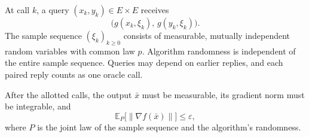 \documentclass[10pt]{article}
\theoremstyle{definition}
\begin{document}
At call $k$, a query $(x_k,y_k)\in E\times E$ receives
\[
\bigl(g(x_k,\xi_k),\,g(y_k,\xi_k)\bigr).
\]
The sample sequence $(\xi_k)_{k\geq0}$ consists of measurable, mutually independent random variables with common law $p$. Algorithm randomness is independent of the entire sample sequence. Queries may depend on earlier replies, and each paired reply counts as one oracle call.

After the allotted calls, the output $\bar{x}$ must be measurable, its gradient norm must be integrable, and
\[
\mathbb{E}_{P}\bigl[\|\nabla f(\bar{x})\|\bigr]\leq\varepsilon,
\]
where $P$ is the joint law of the sample sequence and the algorithm's randomness.
\end{document}
